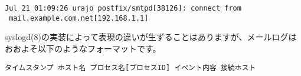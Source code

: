 \begin{verbatim}
Jul 21 01:09:26 urajo postfix/smtpd[38126]: connect from
 mail.example.com.net[192.168.1.1]
\end{verbatim}

syslogd(8)の実装によって表現の違いが生ずることはありますが、メールログはおおよそ以下のようなフォーマットです。

\begin{lstlisting}[basicstyle=\ttfamily\footnotesize, frame=single]
タイムスタンプ ホスト名 プロセス名[プロセスID] イベント内容 接続ホスト
\end{lstlisting}



